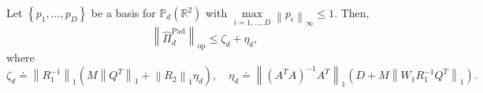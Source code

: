 \documentclass{svjour3}
\renewcommand{\P}{\mathbb{P}} %
\begin{document}
%


\begin{proposition} \label{Thm:EstimateOfNorm}
Let $ \left\{ p_1, \ldots, p_D \right\} $ be a basis for $ \P_d\left(\mathbb{R}^2\right) $ with $\underset{i=1,\dots,D}{\max} \left\lVert p_i \right\rVert_{\infty} \leq 1$. Then,
\begin{equation}
\label{eq:BoundThm}
    \left\lVert \hat{\Pi}_d^{\mathrm{Pad}} \right\rVert_{\mathrm{op}} \leq \zeta_d + \eta_d,
\end{equation}
where
\begin{equation*}
\zeta_d \doteq \left\lVert R_{1}^{-1} \right\rVert_{1} \left(M \left\lVert Q^{T} \right\rVert_{1} + \left\lVert R_{2}\right\rVert_{1}\eta_d\right), \quad     \eta_d \doteq \left\lVert(A^T A)^{-1} A^T \right\rVert_1\left(D + M \left\lVert  W_1 R_{1}^{-1}Q^T\right\rVert_1  \right).
\end{equation*}
\end{proposition}
\end{document}
